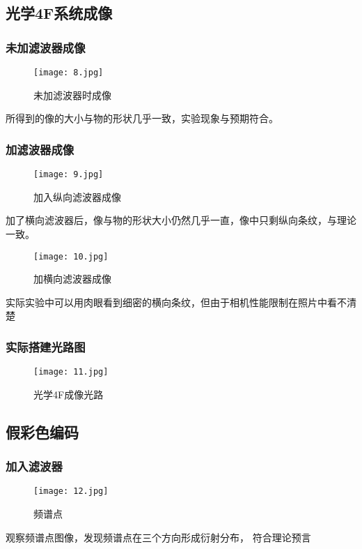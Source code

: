 \documentclass[12pt,a4paper]{article}
\begin{document}
    \subsection{光学4F系统成像}
        \subsubsection{未加滤波器成像}
            \begin{figure}[H]
                \centering
                \texttt{[image: 8.jpg]}
                \caption{未加滤波器时成像}
            \end{figure}

        所得到的像的大小与物的形状几乎一致，实验现象与预期符合。

        \subsubsection{加滤波器成像}
        \begin{figure}[H]
            \centering
            \texttt{[image: 9.jpg]}
            \caption{加入纵向滤波器成像}
        \end{figure}

        加了横向滤波器后，像与物的形状大小仍然几乎一直，像中只剩纵向条纹，与理论一致。

        \begin{figure}[H]
            \centering
            \texttt{[image: 10.jpg]}
            \caption{加横向滤波器成像}
        \end{figure}
      
        实际实验中可以用肉眼看到细密的横向条纹，但由于相机性能限制在照片中看不清楚
            
        \subsubsection{实际搭建光路图}
            \begin{figure}[H]
                \centering
                \texttt{[image: 11.jpg]}
                \caption{光学4F成像光路}
            \end{figure}

    \subsection{假彩色编码}
        
        \subsubsection{加入滤波器}
            \begin{figure}[H]
                \centering
                \texttt{[image: 12.jpg]}
                \caption{频谱点}
            \end{figure}
        观察频谱点图像，发现频谱点在三个方向形成衍射分布，
        符合理论预言
\end{document}
